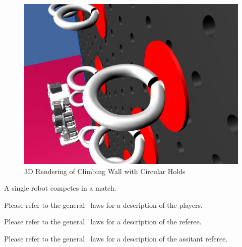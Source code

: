 \documentclass[12pt]{hurocup}
\begin{document}
\begin{figure}
  \begin{center}
    \includegraphics[width=0.45\linewidth]{Figures/climbing-wall2}
  \end{center}
  \caption{3D Rendering of Climbing Wall with Circular
    Holds}
  \label{fig:climbing-wall-holds}
\end{figure}


\begin{lawlist}[CW]
\item A single robot competes in a match.
\end{lawlist}


Please refer to the general \HuroCup\ laws for a description of
the players.


Please refer to the general \HuroCup\ laws for a description of
the referee.


Please refer to the general \HuroCup\ laws for a description of
the assitant referee.

\end{document}
